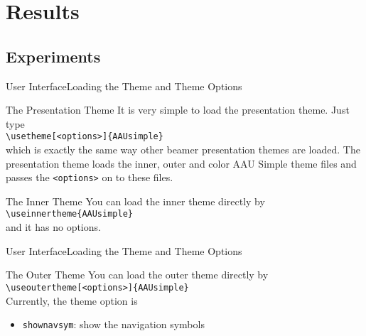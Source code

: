 \documentclass[10pt]{beamer}
\begin{document}
\section{Results}
\subsection{Experiments}
\begin{frame}{User Interface}{Loading the Theme and Theme Options}
  \begin{block}{The Presentation Theme}
    It is very simple to load the presentation theme. Just type\\
    {\tt \textbackslash usetheme[<options>]\{AAUsimple\}}\\
    which is exactly the same way other beamer presentation themes are loaded. The presentation theme loads the inner, outer and color AAU Simple theme files and passes the {\tt <options>} on to these files.
  \end{block}
  \begin{block}{The Inner Theme}
    You can load the inner theme directly by\\
    {\tt \textbackslash useinnertheme\{AAUsimple\}}\\
    and it has no options.
  \end{block}
\end{frame}

\begin{frame}{User Interface}{Loading the Theme and Theme Options}
  \begin{block}{The Outer Theme}
    You can load the outer theme directly by\\
    {\tt \textbackslash useoutertheme[<options>]\{AAUsimple\}}\\
    Currently, the theme option is
  \begin{itemize}
    \item {\tt shownavsym}: show the navigation symbols
  \end{itemize}
  \end{block}
\end{frame}
\end{document}
